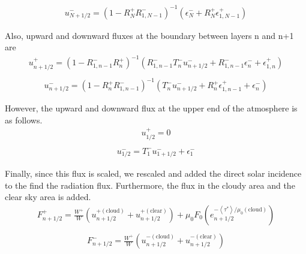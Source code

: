 \begin{equation}
\begin{array}{l}
u_{N+1 / 2}^{-}=\left(1-R_{N}^{+} R_{1, N-1}^{-}\right)^{-1}\left(\epsilon_{N}^{-}+R_{N}^{+} \epsilon_{1, N-1}^{+}\right)
\end{array}
\end{equation}

Also, upward and downward fluxes at the boundary between layers n and
n+1 are \begin{equation}
\begin{array}{l}
u_{n+1 / 2}^{+}=\left(1-R_{1, n-1}^{-} R_{n}^{+}\right)^{-1}\left(R_{1, n-1}^{-} T_{n}^{-} u_{n+1 / 2}^{-}+R_{1, n-1}^{-} \epsilon_{n}^{-}+\epsilon_{1, n}^{+}\right) \\
\end{array}
\end{equation} \begin{equation}
\begin{array}{l}
u_{n+1 / 2}^{-}=\left(1-R_{n}^{+} R_{1, n-1}^{-}\right)^{-1}\left(T_{n}^{-} u_{n+1 / 2}^{-}+R_{n}^{+} \epsilon_{1, n-1}^{+}+\epsilon_{n}^{-}\right)
\end{array}
\end{equation}

However, the upward and downward flux at the upper end of the atmosphere
is as follows. \begin{equation}
\begin{array}{l}
u_{1 / 2}^{+}=0 \\
\end{array}
\end{equation} \begin{equation}
\begin{array}{l}
u_{1 / 2}^{-}=T_{1}^{-} u_{1+1 / 2}^{-}+\epsilon_{1}^{-}
\end{array}
\end{equation}

Finally, since this flux is scaled, we rescaled and added the direct
solar incidence to the find the radiation flux. Furthermore, the flux in
the cloudy area and the clear sky area is added. \begin{equation}
\begin{array}{c}
F_{n+1 / 2}^{+}=\frac{W^{+}}{W}\left(u_{n+1 / 2}^{+(\text{cloud})}+u_{n+1 / 2}^{+(\text{clear})}\right)+\mu_{0} F_{0}\left(e_{n+1 / 2}^{-\left\langle\tau^{*}\right\rangle / \mu_{0}(\text {cloud})}\right) \\
\end{array}
\end{equation} \begin{equation}
\begin{array}{c}
F_{n+1 / 2}^{-}=\frac{W^{+}}{W}\left(u_{n+1 / 2}^{-(\text{cloud})}+u_{n+1 / 2}^{-(\text {clear})}\right)
\end{array}
\end{equation}

